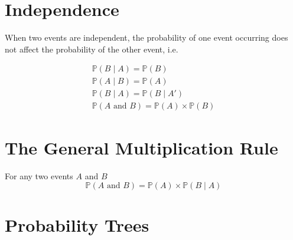 \documentclass[12pt letter]{report}
\begin{document}
\section{Independence}

When two events are independent, the probability of one event occurring does not affect the probability of the other
event, i.e.

\begin{align*}
	\mathbb{P} \left( B  \mid  A \right) = \mathbb{P} \left( B \right)           \\
	\mathbb{P} \left( A  \mid B \right)  = \mathbb{P} \left( A \right)           \\
	\mathbb{P} \left( B  \mid A \right)  = \mathbb{P} \left( B  \mid A'  \right) \\
	\mathbb{P} \left( A \text{ and } B \right) = \mathbb{P} \left( A \right)  \times \mathbb{P} \left( B \right)
\end{align*}

\section{The General Multiplication Rule}

For any two events $A$ and $B$
\[
	\mathbb{P} \left( A \text{ and } B \right) = \mathbb{P} \left( A \right) \times \mathbb{P} \left( B  \mid A \right)
\]

\section{Probability Trees}

\end{document}
